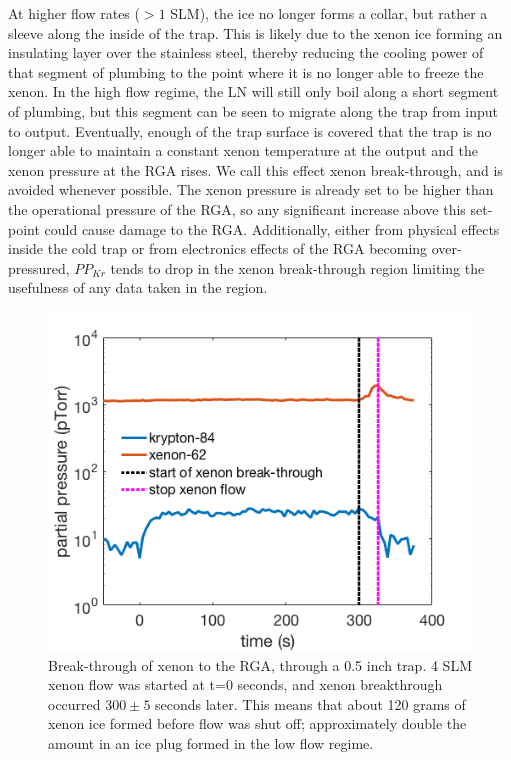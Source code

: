\documentclass[12pt]{article}
\begin{document}
At higher flow rates ($>1$ SLM), the ice no longer forms a collar, but rather a sleeve along the inside of the trap. This is likely due to the xenon ice forming an insulating layer over the stainless steel, thereby reducing the cooling power of that segment of plumbing to the point where it is no longer able to freeze the xenon. In the high flow regime, the LN will still only boil along a short segment of plumbing, but this segment can be seen to migrate along the trap from input to output. Eventually, enough of the trap surface is covered that the trap is no longer able to maintain a constant xenon temperature at the output and the xenon pressure at the RGA rises. We call this effect xenon break-through, and is avoided whenever possible. The xenon pressure is already set to be higher than the operational pressure of the RGA, so any significant increase above this set-point could cause damage to the RGA. Additionally, either from physical effects inside the cold trap or from electronics effects of the RGA becoming over-pressured, $PP_{Kr}$ tends to drop in the xenon break-through region limiting the usefulness of any data taken in the region.
\begin{figure}[h!]
\centering
\includegraphics[width=\textwidth]{Figures/xenon_breakthrough.png}
\caption{Break-through of xenon to the RGA, through a 0.5 inch trap. 4 SLM xenon flow was started at t=0 seconds, and xenon breakthrough occurred $300\pm5$ seconds later. This means that about 120 grams of xenon ice formed before flow was shut off; approximately double the amount in an ice plug formed in the low flow regime.}
\label{fig:breakthrough}
\end{figure} 
\end{document}
